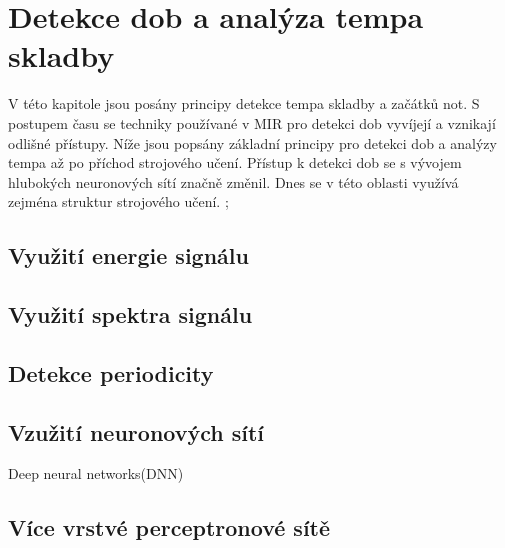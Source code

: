 
\section{Detekce dob a analýza tempa skladby} \label{sec:Detekce_tempa}
V této kapitole jsou posány principy detekce tempa skladby a začátků not.
S postupem času se techniky používané v \acs{MIR} pro detekci dob vyvíjejí a vznikají odlišné přístupy.
Níže jsou popsány základní principy pro detekci dob a analýzy tempa až po příchod strojového učení.
Přístup k detekci dob se s vývojem hlubokých neuronových sítí značně změnil. 
Dnes se v této oblasti využívá zejména struktur strojového učení.
\cite{tempobeatdownbeat:book} \cite{fundamental_of_music_processing};


  \subsection{Využití energie signálu} \label{sec:energie_signalu}

  \subsection{Využití spektra signálu}
  
  \subsection{Detekce periodicity}

  \subsection{Vzužití neuronových sítí}
    Deep neural networks(DNN)
  
  \subsection{Více vrstvé perceptronové sítě}


